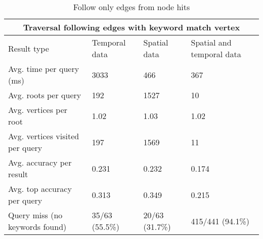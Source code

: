 \begin{table}
	\caption{Follow only edges from node hits}
	\label{table:followHits}
	\begin{tabular}{ |p{3cm}||p{3cm}|p{3cm}|p{3cm}|  }
		\hline
		\multicolumn{4}{|c|}{Traversal following edges with keyword match vertex}                     \\
		\hline
		Result type                     & Temporal data  & Spatial data   & Spatial and temporal data \\
		\hline
		Avg. time per query (ms)        & 3033           & 466            & 367                       \\
		Avg. roots per query            & 192            & 1527           & 10                        \\
		Avg. vertices per root          & 1.02           & 1.03           & 1.02                      \\
		Avg. vertices visited per query & 197            & 1569           & 11                        \\
		Avg. accuracy per result        & 0.231          & 0.232          & 0.174                     \\
		Avg. top accuracy per query     & 0.313          & 0.349          & 0.215                     \\
		Query miss (no keywords found)  & 35/63 (55.5\%) & 20/63 (31.7\%) & 415/441 (94.1\%)          \\
		\hline
	\end{tabular}
\end{table}